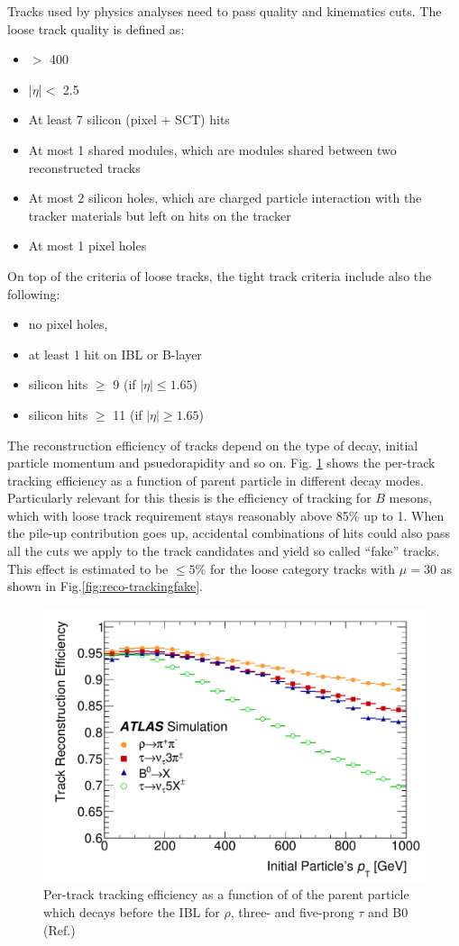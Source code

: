 Tracks used by physics analyses need to pass quality and kinematics cuts. The loose track quality\cite{ATL-PHYS-PUB-2015-018} is defined as:

\begin{itemize}
\item \pT $>$ 400 \mev
\item $|\eta| < $ 2.5
\item At least 7 silicon (pixel + SCT) hits
\item At most 1 shared modules, which are modules shared between two reconstructed tracks
\item At most 2 silicon holes, which are charged particle interaction with the tracker materials but left on hits on the tracker 
\item At most 1 pixel holes
\end{itemize}

On top of the criteria of loose tracks, the tight track criteria\cite{ATL-PHYS-PUB-2015-018} include also the following:

\begin{itemize}
\item no pixel holes, 
\item at least 1 hit on IBL or B-layer
\item silicon hits $\geq$ 9 (if $|\eta|\leq 1.65$)
\item silicon hits $\geq$ 11 (if $|\eta|\geq 1.65$)
\end{itemize}

The reconstruction efficiency of tracks depend on the type of decay, initial particle momentum and psuedorapidity and so on. Fig. \ref{fig:reco-trackingeff} shows the per-track tracking efficiency as a function of parent particle \pt in different decay modes. Particularly relevant for this thesis is the efficiency of tracking for $B$ mesons, which with loose track requirement stays reasonably above 85\% up to 1\TeV. When the pile-up contribution goes up, accidental combinations of hits could also pass all the cuts we apply to the track candidates and yield so called ``fake'' tracks. This effect is estimated to be $\leq 5\%$ for the loose category tracks with $\mu = 30$ as shown in Fig.\ref{fig:reco-trackingfake}.


\begin{figure}[htpb!]
\begin{center}
  \includegraphics[width=0.55\linewidth]{figures/Reco/TrackingEfficiency}
  \caption{Per-track tracking efficiency as a function of \pt of the parent particle which decays before the IBL for $\rho$, three- and five-prong $\tau$ and B0 (Ref.\cite{Aaboud:2017all})}
\label{fig:reco-trackingeff}
\end{center}
\end{figure}

